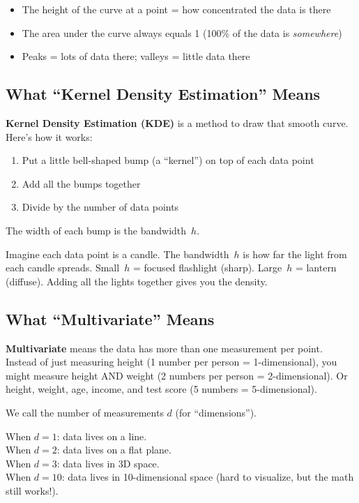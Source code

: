 \documentclass[12pt]{article}
\newcommand{\keyword}[1]{\textbf{\textcolor{blue!70!black}{#1}}}
\newcommand{\analogy}[1]{\begin{tcolorbox}[colback=green!5,colframe=green!50!black,title=Analogy]\small #1\end{tcolorbox}}
\begin{document}
\begin{itemize}
\item The height of the curve at a point = how concentrated the data is there
\item The area under the curve always equals 1 (100\% of the data is \emph{somewhere})
\item Peaks = lots of data there; valleys = little data there
\end{itemize}

\subsection{What ``Kernel Density Estimation'' Means}

\keyword{Kernel Density Estimation (KDE)} is a method to draw that smooth curve. Here's how it works:

\begin{enumerate}
\item Put a little bell-shaped bump (a ``kernel'') on top of each data point
\item Add all the bumps together
\item Divide by the number of data points
\end{enumerate}

The width of each bump is the bandwidth~$h$.

\analogy{Imagine each data point is a candle. The bandwidth~$h$ is how far the light from each candle spreads. Small~$h$ = focused flashlight (sharp). Large~$h$ = lantern (diffuse). Adding all the lights together gives you the density.}

\subsection{What ``Multivariate'' Means}

\keyword{Multivariate} means the data has more than one measurement per point. Instead of just measuring height (1 number per person = 1-dimensional), you might measure height AND weight (2 numbers per person = 2-dimensional). Or height, weight, age, income, and test score (5 numbers = 5-dimensional).

We call the number of measurements $d$ (for ``dimensions'').

When $d = 1$: data lives on a line.\\
When $d = 2$: data lives on a flat plane.\\
When $d = 3$: data lives in 3D space.\\
When $d = 10$: data lives in 10-dimensional space (hard to visualize, but the math still works!).
\end{document}
